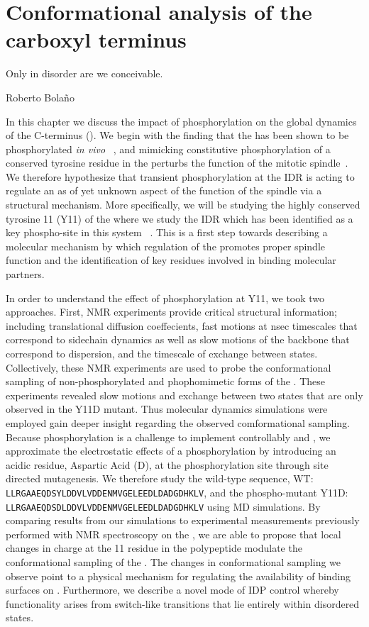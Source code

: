 \chapter{Conformational analysis of the \tub carboxyl terminus}

\epigraph{Only in disorder are we conceivable.}{Roberto Bola\~no}

In this chapter we discuss the impact of phosphorylation on the global dynamics of the \tub C-terminus (\gct). We begin with the finding that the \gct has been shown to be phosphorylated {\it in vivo} ~\cite{keck2011cell}, and mimicking constitutive phosphorylation of a conserved tyrosine residue in the \gct perturbs the function of the mitotic spindle~\cite{vogel2001phosphorylation}. We therefore hypothesize  that  transient phosphorylation at  the \gct IDR  is acting  to  regulate an as of yet unknown aspect of the function of the spindle via a structural mechanism. More specifically, we will be studying  the highly conserved tyrosine 11 (Y11) of the \gct where we study the IDR which has been identified as a key phospho-site  in this system ~\cite{vogel2001phosphorylation}. This is a first step towards describing a molecular mechanism by which regulation of the \gct promotes proper spindle function and the identification of key residues involved in binding molecular partners. 

In order to understand the effect of phosphorylation at Y11, we took two approaches. First, NMR experiments provide critical structural information; including translational diffusion coeffecients, fast motions at nsec timescales that correspond to sidechain dynamics as well as slow motions of the backbone that correspond to dispersion, and the timescale of exchange between states. Collectively, these NMR experiments are used to probe the conformational sampling  of non-phosphorylated  and  phophomimetic forms of the  \gct. These experiments revealed slow motions and exchange between two states that are only observed in the Y11D mutant.  Thus molecular dynamics simulations were employed gain deeper insight regarding the observed comformational sampling. Because phosphorylation is  a challenge to  implement  controllably  \vivo and \vitro, we approximate the electrostatic  effects of a phosphorylation by introducing an acidic residue, Aspartic  Acid (D),  at  the phosphorylation site through site directed mutagenesis. We therefore study the wild-type sequence, WT: \texttt{LLRGAAEQDSYLDDVLVDDENMVGELEEDLDADGDHKLV}, and the phospho-mutant Y11D: \texttt{LLRGAAEQDSDLDDVLVDDENMVGELEEDLDADGDHKLV} using MD simulations. By comparing results from our simulations to experimental measurements previously performed with NMR spectroscopy on the \gct, we are able to propose that local changes in charge at the 11 residue in the polypeptide modulate the conformational sampling of the \gct. The changes in conformational sampling we observe point to a physical mechanism for regulating the availability of binding surfaces on \tub. Furthermore, we describe a novel mode of IDP control whereby functionality arises from switch-like transitions that lie entirely within disordered states.

